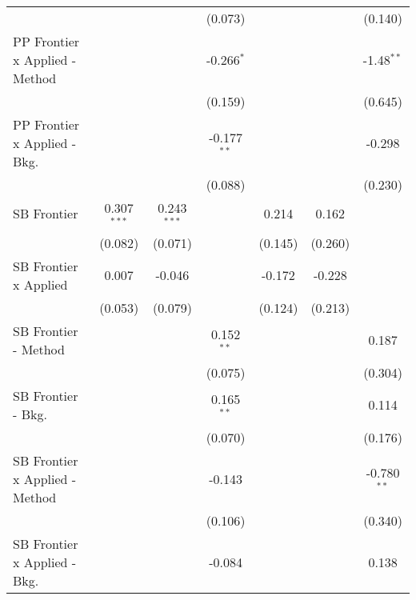 \begin{tabular}{lcccccc}
                                  &                &                & (0.073)       &               &         & (0.140)\\   
   PP Frontier x Applied - Method &                &                & -0.266$^{*}$  &               &         & -1.48$^{**}$\\   
                                  &                &                & (0.159)       &               &         & (0.645)\\   
   PP Frontier x Applied - Bkg.   &                &                & -0.177$^{**}$ &               &         & -0.298\\   
                                  &                &                & (0.088)       &               &         & (0.230)\\   
   SB Frontier                    & 0.307$^{***}$  & 0.243$^{***}$  &               & 0.214         & 0.162   &   \\   
                                  & (0.082)        & (0.071)        &               & (0.145)       & (0.260) &   \\   
   SB Frontier x Applied          & 0.007          & -0.046         &               & -0.172        & -0.228  &   \\   
                                  & (0.053)        & (0.079)        &               & (0.124)       & (0.213) &   \\   
   SB Frontier - Method           &                &                & 0.152$^{**}$  &               &         & 0.187\\   
                                  &                &                & (0.075)       &               &         & (0.304)\\   
   SB Frontier - Bkg.             &                &                & 0.165$^{**}$  &               &         & 0.114\\   
                                  &                &                & (0.070)       &               &         & (0.176)\\   
   SB Frontier x Applied - Method &                &                & -0.143        &               &         & -0.780$^{**}$\\   
                                  &                &                & (0.106)       &               &         & (0.340)\\   
   SB Frontier x Applied - Bkg.   &                &                & -0.084        &               &         & 0.138\\   

\end{tabular}

